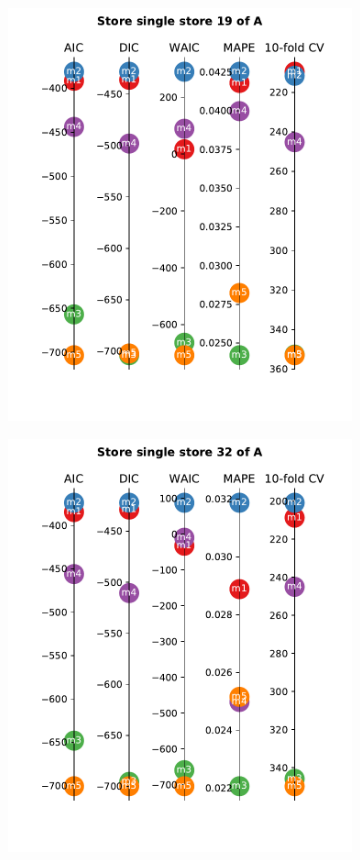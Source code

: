 \documentclass[english, 12pt, a4paper, sci, utf8, a-1b, online]{aaltothesis}
\begin{document}
\begin{figure}
\begin{subfigure}[htb]{0.33\textwidth}
		\includegraphics[width=\textwidth]{../plots/metrics/metrics_plot_single_store_19_of_A.pdf}
	\end{subfigure}
	\begin{subfigure}[htb]{0.33\textwidth}
		\centering
		\includegraphics[width=\textwidth]{../plots/metrics/metrics_plot_single_store_32_of_A.pdf}

\end{subfigure}
\end{figure}
\end{document}
